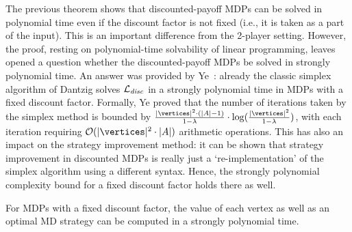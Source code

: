 The previous theorem shows that discounted-payoff MDPs can be solved in 
polynomial time even if the discount factor is not fixed (i.e., it is taken as 
a part of the input). This is an important difference from the 2-player 
setting. However, the proof, resting on polynomial-time solvability of linear 
programming, leaves opened a question whether the discounted-payoff 
MDPs be solved in strongly polynomial time.  An answer was provided by Ye~\cite{Ye:2011}: already the classic simplex 
algorithm of Dantzig solves $\mathcal{L}_{\mathit{disc}}$ in a strongly 
polynomial time in MDPs with a fixed discount factor. Formally, Ye proved that 
the number of iterations taken by the simplex method is bounded by 
$\frac{|\vertices|^2\cdot (|\actions|-1)}{1-\lambda}\cdot 
\log(\frac{|\vertices|^2}{1-\lambda})$, with each iteration requiring  
$\mathcal{O}(|\vertices|^2\cdot |\actions|)$ arithmetic operations. This has 
also an impact on the strategy improvement method: it can be shown that strategy 
improvement in discounted MDPs is really just a `re-implementation' of the 
simplex algorithm using a different syntax. Hence, the strongly polynomial 
complexity bound for a fixed discount factor holds there as well.

\begin{theorem}
For MDPs with a fixed discount factor, the value of each vertex as well as an 
optimal MD strategy can be computed in a strongly polynomial time.
\end{theorem}
